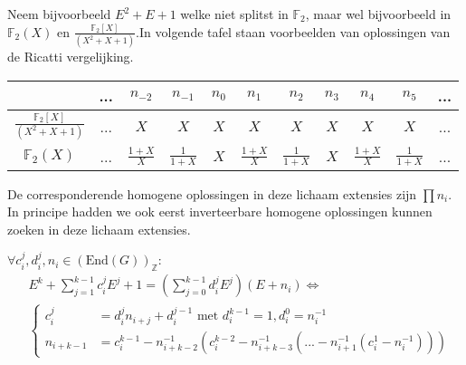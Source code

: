 \documentclass[a4paper,12pt]{article}
\begin{document}
\begin{example}
    Neem bijvoorbeeld $E^2+E+1$ welke niet splitst in $\mathbb{F}_2$, maar wel bijvoorbeeld in $\mathbb{F}_2(X)$ en
    $\frac{\mathbb{F}_2[X]}{(X^2+X+1)}$.In volgende tafel staan voorbeelden van oplossingen van de Ricatti vergelijking.
    \begin{table}[ht]
        \centering
        \begin{tabular}{|c||c|c|c|c|c|c|c|c|c|c|} \hline
                                                & ... & $n_{-2}$        & $n_{-1}$        & $n_{0}$ & $n_{1}$         & $n_{2}$         & $n_{3}$ & $n_{4}$         & $n_{5}$         & ... \\ \hline \hline
            $\frac{\mathbb{F}_2[X]}{(X^2+X+1)}$ & ... & $X$             & $X$             & $X$     & $X$             & $X$             & $X$     & $X$             & $X$             & ... \\ \hline
            $\mathbb{F}_2(X)$                   & ... & $\frac{1+X}{X}$ & $\frac{1}{1+X}$ & $X$     & $\frac{1+X}{X}$ & $\frac{1}{1+X}$ & $X$     & $\frac{1+X}{X}$ & $\frac{1}{1+X}$ & ... \\ \hline
        \end{tabular}
    \end{table}
    De corresponderende homogene oplossingen  in deze lichaam extensies zijn $\prod{n_i}$.
    In principe hadden we ook eerst inverteerbare homogene oplossingen kunnen zoeken in deze lichaam extensies.
\end{example}


\begin{conjecture}
    $\forall c_i^j ,d_i^j ,n_i \in (\text{End}(G))_{\mathbb{Z}}:$
    \begin{align*}
         & E^k + \sum_{j=1}^{k-1}c_i^j E^j + 1  = (\sum_{j=0}^{k-1}d_i^j E^j)(E+n_i) \Leftrightarrow                      \\
         & \left\{\begin{aligned}
                      c^j_i     & = d^j_i n_{i+j}+d^{j-1}_i \text{ met } d^{k-1}_i=1, d^0_i = n^{-1}_i                        \\
                      n_{i+k-1} & = c^{k-1}_i-n^{-1}_{i+k-2}(c^{k-2}_i-n^{-1}_{i+k-3}(... -n^{-1}_{i+1}(c^{1}_i-n^{-1}_{i})))
                  \end{aligned} \right.
    \end{align*}

\end{conjecture}
\end{document}
